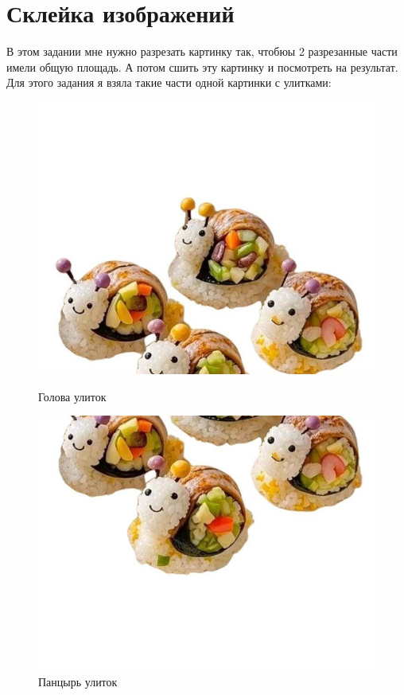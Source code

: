 \documentclass[a4paper,12pt]{article}
\begin{document}
\section{Склейка изображений}
В этом задании мне нужно разрезать картинку так, чтобюы 2 разрезанные части имели общую площадь. А потом сшить эту картинку и посмотреть на результат. Для этого задания я взяла такие части одной картинки с улитками:

\begin{figure}[H]
    \centering
    \begin{minipage}{0.48\textwidth}
        \centering
        \includegraphics[width=\linewidth]{lab2/task3/ulitkiTop.jpg}
        \caption{Голова улиток}
        \label{fig:reflect_ox}
    \end{minipage}
    \hfill
    \begin{minipage}{0.48\textwidth}
        \centering
        \includegraphics[width=\linewidth]{lab2/task3/ulitkiBottom.jpg}
        \caption{Панцырь улиток}
        \label{fig:reflect_oy}
    \end{minipage}
\end{figure}
\end{document}
